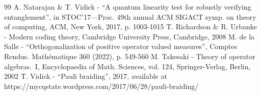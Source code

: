 \begin{thebibliography}{99}
 A. Natarajan \& T. Vidick - “A quantum linearity test for robustly verifying entanglement”, in STOC’17—Proc. 49th annual ACM SIGACT symp. on theory of computing, ACM, New York, 2017, p. 1003-1015
 T. Richardson \& R. Urbanke - Modern coding theory, Cambridge University Press, Cambridge, 2008
 M. de la Salle - “Orthogonalization of positive operator valued measures”, Comptes Rendus. Mathématique 360 (2022), p. 549-560
 M. Takesaki - Theory of operator algebras. I, Encyclopaedia of Math. Sciences, vol. 124, Springer-Verlag, Berlin, 2002
 T. Vidick - “Pauli braiding”, 2017, available at https://mycqstate.wordpress.com/2017/06/28/pauli-braiding/
\end{thebibliography}

